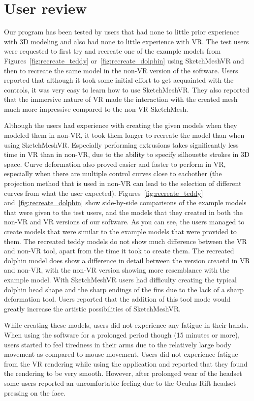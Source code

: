 \section{User review}
Our program has been tested by users that had none to little prior experience with 3D modeling and also had none to little experience with VR. The test users were requested to first try and recreate one of the example models from Figures~\ref{fig:recreate_teddy} or~\ref{fig:recreate_dolphin} using SketchMeshVR and then to recreate the same model in the non-VR version of the software. Users reported that although it took some initial effort to get acquainted with the controls, it was very easy to learn how to use SketchMeshVR. They also reported that the immersive nature of VR made the interaction with the created mesh much more impressive compared to the non-VR SketchMesh. 

Although the users had experience with creating the given models when they modeled them in non-VR, it took them longer to recreate the model than when using SketchMeshVR. Especially performing extrusions takes significantly less time in VR than in non-VR, due to the ability to specify silhouette strokes in 3D space. Curve deformation also proved easier and faster to perform in VR, especially when there are multiple control curves close to eachother (the projection method that is used in non-VR can lead to the selection of different curves from what the user expected). Figures~\ref{fig:recreate_teddy} and~\ref{fig:recreate_dolphin} show side-by-side comparisons of the example models that were given to the test users, and the models that they created in both the non-VR and VR versions of our software. As you can see, the users managed to create models that were similar to the example models that were provided to them. The recreated teddy models do not show much difference between the VR and non-VR tool, apart from the time it took to create them. The recreated dolphin model does show a difference in detail between the version creaetd in VR and non-VR, with the non-VR version showing more resemblance with the example model. With SketchMeshVR users had difficulty creating the typical dolphin head shape and the sharp endings of the fins due to the lack of a sharp deformation tool. Users reported that the addition of this tool mode would greatly increase the artistic possibilities of SketchMeshVR.

While creating these models, users did not experience any fatigue in their hands. When using the software for a prolonged period though (15 minutes or more), users started to feel tiredness in their arms due to the relatively large body movement as compared to mouse movement. Users did not experience fatigue from the VR rendering while using the application and reported that they found the rendering to be very smooth. However, after prolonged wear of the headset some users reported an uncomfortable feeling due to the Oculus Rift headset pressing on the face. 


